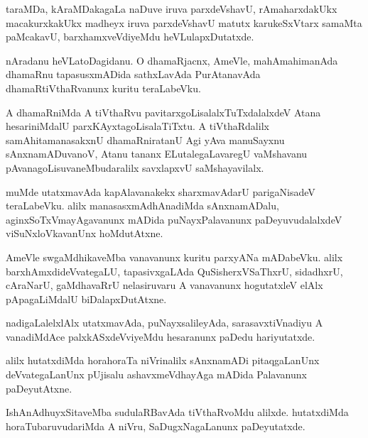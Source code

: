 \documentclass{article}
\begin{document}
\begin{mn}
taraMDa, kAraMDakagaLa naDuve iruva parxdeVshavU, rAmaharxdakUkx macakurxkakUkx madheyx iruva 
parxdeVshavU matutx karukeSxVtarx samaMta paMcakavU, barxhamxveVdiyeMdu heVLulapxDutatxde.
\end{mn}


\begin{mn}
nAradanu heVLatoDagidanu. O dhamaRjacnx, AmeVle, mahAmahimanAda dhamaRnu tapasusxmADida 
sathxLavAda PurAtanavAda dhamaRtiVthaRvanunx kuritu teraLabeVku.
\end{mn}

\begin{mn}
A dhamaRniMda A tiVthaRvu pavitarxgoLisalalxTuTxdalalxdeV Atana hesariniMdalU 
parxKAyxtagoLisalaTiTxtu. A tiVthaRdalilx samAhitamanasakxnU dhamaRniratanU Agi yAva manuSayxnu
sAnxnamADuvanoV, Atanu tananx ELutalegaLavaregU vaMshavanu pAvanagoLisuvaneMbudaralilx savxlapxvU 
saMshayavilalx.
\end{mn}

\begin{mn}
muMde utatxmavAda kapAlavanakekx sharxmavAdarU parigaNisadeV teraLabeVku. alilx 
manasasxmAdhAnadiMda sAnxnamADalu, aginxSoTxVmayAgavanunx mADida puNayxPalavanunx 
paDeyuvudalalxdeV viSuNxloVkavanUnx hoMdutAtxne.
\end{mn}

\begin{mn}
AmeVle swgaMdhikaveMba vanavanunx kuritu parxyANa mADabeVku. alilx barxhAmxdideVvategaLU, 
tapasivxgaLAda QuSisherxVSaThxrU, sidadhxrU, cAraNarU, gaMdhavaRrU nelasiruvaru A vanavanunx 
hogutatxleV elAlx pApagaLiMdalU biDalapxDutAtxne.
\end{mn}

\begin{mn}
nadigaLalelxlAlx utatxmavAda, puNayxsalileyAda, sarasavxtiVnadiyu A vanadiMdAce palxkASxdeVviyeMdu 
hesaranunx paDedu hariyutatxde.
\end{mn}

\begin{mn}
alilx hutatxdiMda horahoraTa niVrinalilx sAnxnamADi pitaqgaLanUnx deVvategaLanUnx pUjisalu 
ashavxmeVdhayAga mADida Palavanunx paDeyutAtxne.
\end{mn}

\begin{mn}
IshAnAdhuyxSitaveMba sudulaRBavAda tiVthaRvoMdu alilxde. hutatxdiMda horaTubaruvudariMda A niVru,
SaDugxNagaLanunx paDeyutatxde.
\end{mn}
\end{document}
